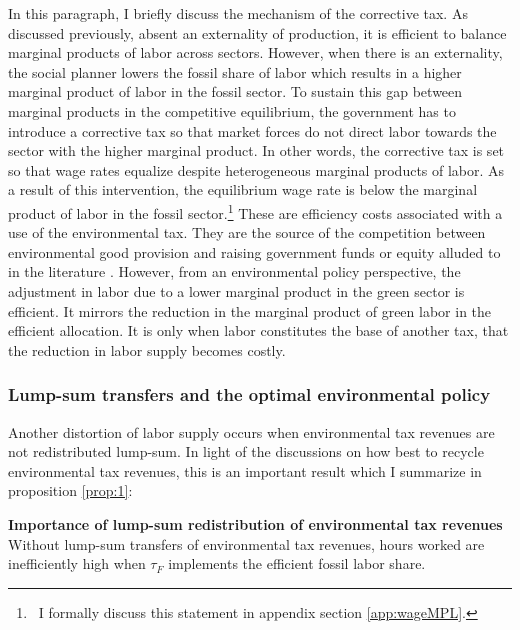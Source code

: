 In this paragraph, I briefly discuss the mechanism of the corrective tax.
As discussed previously, absent an externality of production, it is efficient to balance marginal products of labor across sectors. However, when there is an externality, the social planner lowers the fossil share of labor which results in a higher marginal product of labor in the fossil sector. To sustain this gap between marginal products in the competitive equilibrium, the government has to introduce a corrective tax so that market forces do not direct labor towards the sector with the higher marginal product. In other words, the corrective tax is set so that wage rates equalize despite heterogeneous marginal products of labor. As a result of this intervention, the equilibrium wage rate is below the marginal product of labor in the fossil sector.\footnote{\ I formally discuss this statement in appendix section \ref{app:wageMPL}.} These are efficiency costs associated with a use of the environmental tax. They are the source of the competition between environmental good provision and raising government funds or equity alluded to in the literature \citep[e.g.][]{LansBovenberg1994EnvironmentalTaxation}.  
However, from an environmental policy perspective, the adjustment in labor due to a lower marginal product in the green sector is efficient. It mirrors the reduction in the marginal product of green labor in the efficient allocation. It is only when labor constitutes the base of another tax, that the reduction in labor supply becomes costly. 
\subsubsection{Lump-sum transfers and the optimal environmental policy}\label{subsec:nolump}

Another distortion of labor supply occurs when environmental tax revenues are not redistributed lump-sum.
In light of the discussions on how best to recycle environmental tax revenues, this is an important result which I summarize in proposition \ref{prop:1}:

\begin{prop}\label{prop:1}\textbf{Importance of lump-sum redistribution of environmental tax revenues}
	Without lump-sum transfers of environmental tax revenues, hours worked are inefficiently high when $\tau_{F}$ implements the efficient fossil labor share.
\end{prop}

